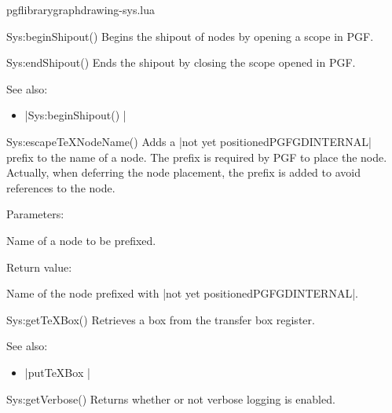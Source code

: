 
\begin{filedescription}{pgflibrarygraphdrawing-sys.lua}


\begin{luacommand}{{Sys:beginShipout}()}
Begins the shipout of nodes by opening a scope in PGF. 



\end{luacommand}
\begin{luacommand}{{Sys:endShipout}()}
Ends the shipout by closing the scope opened in PGF. 



See also:
\begin{itemize}
	\item[] |Sys:beginShipout() |
\end{itemize}

\end{luacommand}
\begin{luacommand}{{Sys:escapeTeXNodeName}()}
Adds a |not yet positionedPGFGDINTERNAL| prefix to the name of a node.  The prefix is required by PGF to place the node. Actually, when deferring the node placement, the prefix is added to avoid references to the node. 

Parameters:
\begin{parameterdescription}
	\item[\meta{name}] Name of a node to be prefixed. 
\end{parameterdescription}


Return value:
\begin{parameterdescription} 
  \item[] Name of the node prefixed with |not yet positionedPGFGDINTERNAL|. 
\end{parameterdescription}


\end{luacommand}
\begin{luacommand}{{Sys:getTeXBox}()}
Retrieves a box from the transfer box register. 



See also:
\begin{itemize}
	\item[] |putTeXBox |
\end{itemize}

\end{luacommand}
\begin{luacommand}{{Sys:getVerbose}()}
Returns whether or not verbose logging is enabled. 



\end{luacommand}
\end{filedescription}

